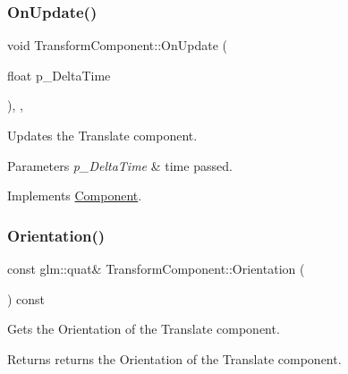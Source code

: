 \subsubsection{\texorpdfstring{OnUpdate()}{OnUpdate()}}
{\footnotesize\ttfamily void Transform\+Component\+::\+On\+Update (\begin{DoxyParamCaption}\item[{float}]{p\+\_\+\+Delta\+Time }\end{DoxyParamCaption})\hspace{0.3cm}{\ttfamily [inline]}, {\ttfamily [override]}, {\ttfamily [virtual]}}



Updates the Translate component. 


\begin{DoxyParams}{Parameters}
{\em p\+\_\+\+Delta\+Time} & time passed. \\
\hline
\end{DoxyParams}


Implements \mbox{\hyperlink{class_component_ac080e9fa054949464c796b65a4b26b93}{Component}}.

\mbox{\label{class_transform_component_aae8fd949d2ecb08fc12fd0bdee8c2ddc}} 
\subsubsection{\texorpdfstring{Orientation()}{Orientation()}}
{\footnotesize\ttfamily const glm\+::quat\& Transform\+Component\+::\+Orientation (\begin{DoxyParamCaption}{ }\end{DoxyParamCaption}) const\hspace{0.3cm}{\ttfamily [inline]}}



Gets the Orientation of the Translate component. 

\begin{DoxyReturn}{Returns}
returns the Orientation of the Translate component. 
\end{DoxyReturn}
\mbox{\label{class_transform_component_a4c090d0fa38ebead21ec208fbb26d5c5}} 
